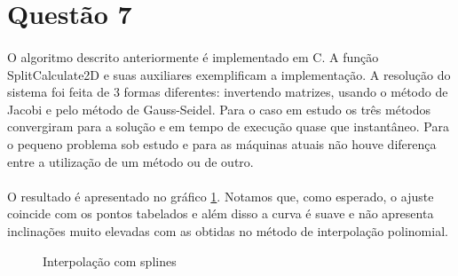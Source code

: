 \section*{Questão 7}
\paragraph{}O algoritmo descrito anteriormente é implementado em C. A função 
SplitCalculate2D e suas auxiliares exemplificam a implementação.
A resolução do sistema foi feita de 3 formas diferentes: invertendo matrizes,
usando o método de Jacobi e pelo método de Gauss-Seidel. Para o caso em estudo
os três métodos convergiram para a solução e em tempo de execução quase que instantâneo.
Para o pequeno problema sob estudo e para as máquinas atuais não houve diferença
entre a utilização de um método ou de outro.

\paragraph{}O resultado é apresentado no gráfico \ref{fig:quest7}. Notamos que, 
como esperado, o ajuste coincide com os pontos tabelados e além disso a curva 
é suave e não apresenta inclinações muito elevadas com as obtidas no método
de interpolação polinomial. 
\FloatBarrier
\begin{figure}[!htp]
	
	\caption{Interpolação com splines}
	\label{fig:quest7}
\end{figure}
\FloatBarrier
